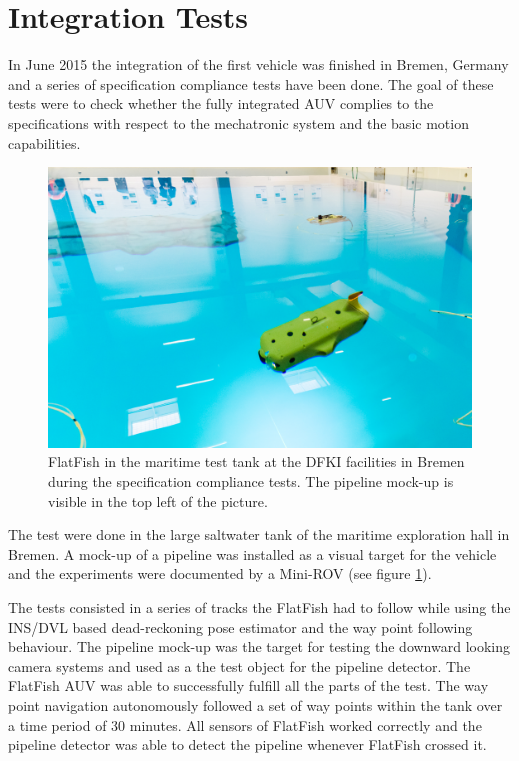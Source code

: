 \documentclass[conference]{IEEEtran}
\begin{document}
\section{Integration Tests}

In June 2015 the integration of the first vehicle was finished in Bremen, Germany and a
series of specification compliance tests have been done. The goal of these tests were to
check whether the fully integrated AUV complies to the specifications with respect to the
mechatronic system and the basic motion capabilities. 

\begin{figure}[!t]
	\centering
	\includegraphics[width=0.9\columnwidth]{FlatFish-2.jpg}
	\caption{FlatFish in the maritime test tank at the DFKI facilities in Bremen during the 
	specification compliance tests. The pipeline mock-up is visible in the top left of the 
	picture.}
	\label{fig:flatfish2}
\end{figure}

The test were done in the large saltwater tank of the maritime exploration hall in Bremen.
A mock-up of a pipeline was installed as a visual target for the vehicle and the
experiments were documented by a Mini-ROV (see figure \ref{fig:flatfish2}). 

The tests consisted in a series of tracks the FlatFish had to follow while using the
INS/DVL based dead-reckoning pose estimator and the way point following behaviour. The
pipeline mock-up was the target for testing the downward looking camera systems and 
used
as a the test object for the pipeline detector. The FlatFish AUV was able to successfully
fulfill all the parts of the test. The way point navigation autonomously followed a set of
way points within the tank over a time period of 30 minutes. All sensors of FlatFish
worked correctly and the pipeline detector was able to detect the pipeline whenever
FlatFish crossed it. 
\end{document}
